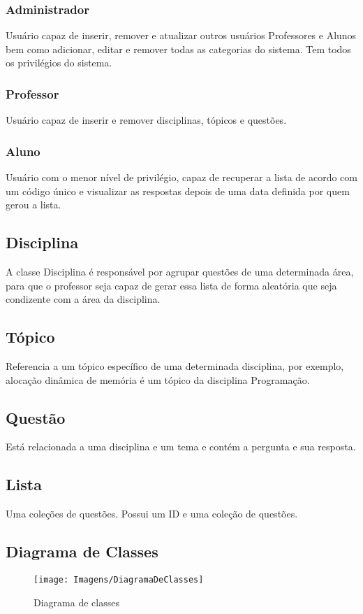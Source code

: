 \documentclass[12pt,oneside,a4paper,article]{abntex2}
\begin{document}
				\subsubsection{Administrador}
					Usuário capaz de inserir, remover e atualizar outros usuários Professores e Alunos bem como adicionar, editar e remover todas as categorias do
					sistema. Tem todos os privilégios do sistema.
				\subsubsection{Professor}
				Usuário capaz de inserir e remover disciplinas, tópicos e questões.
	
				\subsubsection{Aluno}
					Usuário com o menor nível de privilégio, capaz de recuperar a lista de acordo com um código único e visualizar as respostas depois de uma data definida
					por quem gerou a lista.

		\subsection{Disciplina}
			A classe Disciplina é responsável por agrupar questões de uma determinada área, para que o professor seja capaz de gerar essa lista de forma aleatória que seja condizente
			com a área da disciplina.
	
		\subsection{Tópico}
			Referencia a um tópico específico de uma determinada disciplina, por exemplo, alocação dinâmica de memória é um tópico da disciplina Programação.
	
		\subsection{Questão}
			Está relacionada a uma disciplina e um tema e contém a pergunta e sua resposta.
	
		\subsection{Lista}
			Uma coleções de questões. Possui um ID e uma coleção de questões.
		
		\subsection{Diagrama de Classes}
			\begin{figure}[h]
				\centering
				\texttt{[image: Imagens/DiagramaDeClasses]}
				\caption{Diagrama de classes}
				\label{fig:diagramaclasses}
			\end{figure}
		
\end{document}
